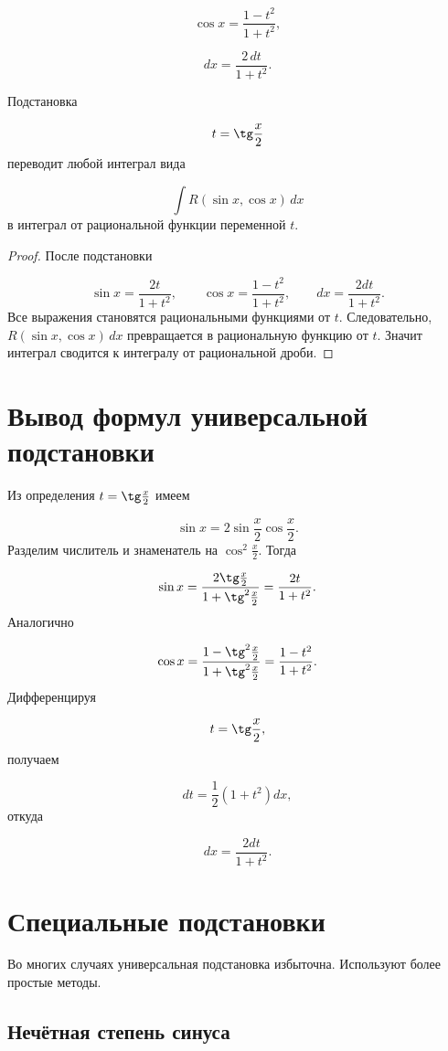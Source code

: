 \documentclass[14pt]{extreport}
\begin{document}
\[
\cos x=\frac{1-t^2}{1+t^2},
\]

\[
dx=\frac{2\,dt}{1+t^2}.
\]

\begin{theorem}
Подстановка

\[
t=\tg\frac{x}{2}
\]
переводит любой интеграл вида

\[
\int R(\sin x,\cos x)\,dx
\]
в интеграл от рациональной функции переменной $t$.
\end{theorem}

\begin{proof}

После подстановки

\[
\sin x=\frac{2t}{1+t^2},
\qquad
\cos x=\frac{1-t^2}{1+t^2},
\qquad
dx=\frac{2dt}{1+t^2}.
\]
Все выражения становятся рациональными функциями от $t$.
Следовательно, 
$R(\sin x,\cos x)\,dx$
превращается в рациональную функцию от $t$.
Значит интеграл сводится к интегралу от рациональной дроби.
\end{proof}

\section{Вывод формул универсальной подстановки}

Из определения $t=\tg\frac{x}{2}$
имеем

\[
\sin x
=
2\sin\frac{x}{2}\cos\frac{x}{2}.
\]
Разделим числитель и знаменатель на $\cos^2\frac{x}{2}.$
Тогда

\[
\sin x
=
\frac{2\tg\frac{x}{2}}
     {1+\tg^2\frac{x}{2}}
=
\frac{2t}{1+t^2}.
\]
Аналогично

\[
\cos x
=
\frac{1-\tg^2\frac{x}{2}}
     {1+\tg^2\frac{x}{2}}
=
\frac{1-t^2}{1+t^2}.
\]
Дифференцируя

\[
t=\tg\frac{x}{2},
\]
получаем

\[
dt=
\frac12\left(1+t^2\right)dx,
\]
откуда

\[
dx=\frac{2dt}{1+t^2}.
\]

\section{Специальные подстановки}

Во многих случаях универсальная подстановка избыточна.
Используют более простые методы.

\subsection{Нечётная степень синуса}
\end{document}
